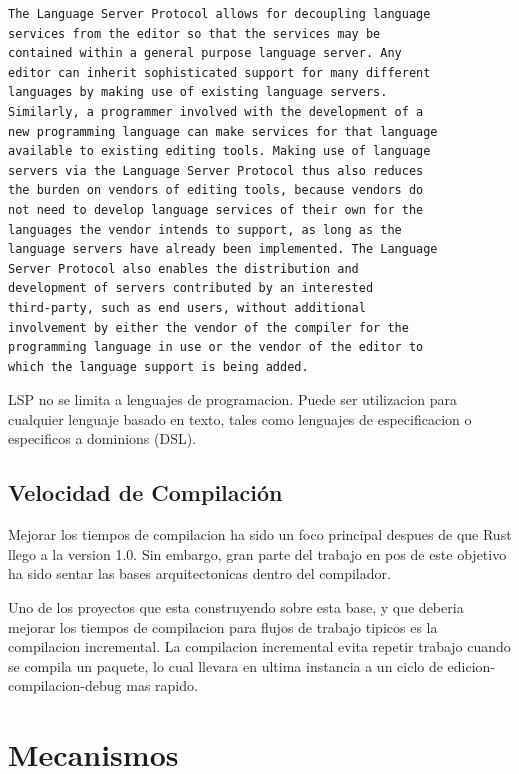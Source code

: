 \documentclass[12pt, a4paper]{report}
\begin{document}
\begin{verbatim}
The Language Server Protocol allows for decoupling language
services from the editor so that the services may be
contained within a general purpose language server. Any
editor can inherit sophisticated support for many different
languages by making use of existing language servers.
Similarly, a programmer involved with the development of a
new programming language can make services for that language
available to existing editing tools. Making use of language
servers via the Language Server Protocol thus also reduces
the burden on vendors of editing tools, because vendors do
not need to develop language services of their own for the
languages the vendor intends to support, as long as the
language servers have already been implemented. The Language
Server Protocol also enables the distribution and
development of servers contributed by an interested
third-party, such as end users, without additional
involvement by either the vendor of the compiler for the
programming language in use or the vendor of the editor to
which the language support is being added.
\end{verbatim}
\cite{language_server_protocol_wiki}

LSP no se limita a lenguajes de programacion.
Puede ser utilizacion para cualquier lenguaje basado en texto, tales como lenguajes de especificacion o especificos a dominions (DSL).
\cite{language_server_protocol_wiki}

\section*{Velocidad de Compilación}

Mejorar los tiempos de compilacion ha sido un foco principal despues de que Rust llego a la version 1.0.
Sin embargo, gran parte del trabajo en pos de este objetivo ha sido sentar las bases arquitectonicas dentro del compilador.

Uno de los proyectos que esta construyendo sobre esta base, y que deberia mejorar los tiempos de compilacion para flujos de trabajo tipicos es la compilacion incremental.
La compilacion incremental evita repetir trabajo cuando se compila un paquete, lo cual llevara en ultima instancia a un ciclo de edicion-compilacion-debug mas rapido.
\cite{rust_blog_incremental_compilation}

\chapter*{Mecanismos}
\end{document}
